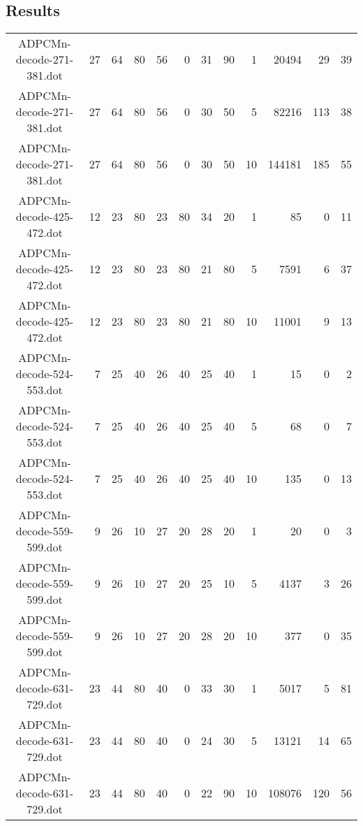 \documentclass[colorback,accentcolor=tud1c,11pt]{tudreport}
\begin{document}
 \begin{landscape}
  \chapter{Results}
  \begin{tabular}{ c | r | r | r | r | r | r | r | r | r | r | r }
   ADPCMn-decode-271-381.dot                &  27 &  64 & 80 &  56 &  0 &  31 & 90 &  1 &  20494 &   29 & 39 \\
   ADPCMn-decode-271-381.dot                &  27 &  64 & 80 &  56 &  0 &  30 & 50 &  5 &  82216 &  113 & 38 \\
   ADPCMn-decode-271-381.dot                &  27 &  64 & 80 &  56 &  0 &  30 & 50 & 10 & 144181 &  185 & 55 \\
   ADPCMn-decode-425-472.dot                &  12 &  23 & 80 &  23 & 80 &  34 & 20 &  1 &     85 &    0 & 11 \\
   ADPCMn-decode-425-472.dot                &  12 &  23 & 80 &  23 & 80 &  21 & 80 &  5 &   7591 &    6 & 37 \\
   ADPCMn-decode-425-472.dot                &  12 &  23 & 80 &  23 & 80 &  21 & 80 & 10 &  11001 &    9 & 13 \\
   ADPCMn-decode-524-553.dot                &   7 &  25 & 40 &  26 & 40 &  25 & 40 &  1 &     15 &    0 &  2 \\
   ADPCMn-decode-524-553.dot                &   7 &  25 & 40 &  26 & 40 &  25 & 40 &  5 &     68 &    0 &  7 \\
   ADPCMn-decode-524-553.dot                &   7 &  25 & 40 &  26 & 40 &  25 & 40 & 10 &    135 &    0 & 13 \\
   ADPCMn-decode-559-599.dot                &   9 &  26 & 10 &  27 & 20 &  28 & 20 &  1 &     20 &    0 &  3 \\
   ADPCMn-decode-559-599.dot                &   9 &  26 & 10 &  27 & 20 &  25 & 10 &  5 &   4137 &    3 & 26 \\
   ADPCMn-decode-559-599.dot                &   9 &  26 & 10 &  27 & 20 &  28 & 20 & 10 &    377 &    0 & 35 \\
   ADPCMn-decode-631-729.dot                &  23 &  44 & 80 &  40 &  0 &  33 & 30 &  1 &   5017 &    5 & 81 \\
   ADPCMn-decode-631-729.dot                &  23 &  44 & 80 &  40 &  0 &  24 & 30 &  5 &  13121 &   14 & 65 \\
   ADPCMn-decode-631-729.dot                &  23 &  44 & 80 &  40 &  0 &  22 & 90 & 10 & 108076 &  120 & 56 \\

\end{tabular}
\end{landscape}
\end{document}
